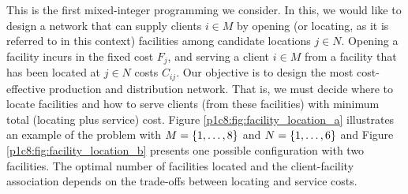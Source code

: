 This is the first mixed-integer programming we consider. In this, we would like to design a network that can supply clients $i \in M$ by opening (or locating, as it is referred to in this context) facilities among candidate locations $j \in N$. Opening a facility incurs in the fixed cost $F_j$, and serving a client $i \in M$ from a facility that has been located at $j \in N$ costs $C_{ij}$. Our objective is to design the most cost-effective production and distribution network. That is, we must decide where to locate facilities and how to serve clients (from these facilities) with minimum total (locating plus service) cost. Figure \ref{p1c8:fig:facility_location_a} illustrates an example of the problem with $M = \left\{ 1,\dots,8 \right \}$ and $N = \left\{ 1,\dots,6 \right \}$ and Figure \ref{p1c8:fig:facility_location_b} presents one possible configuration with two facilities. The optimal number of facilities located and the client-facility association depends on the trade-offs between locating and service costs.	

